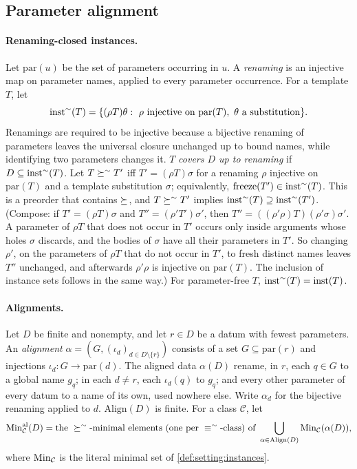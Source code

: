 \subsection{Parameter alignment}\label{app:setting:align}

\paragraph{Renaming-closed instances.}
Let $\mathrm{par}(u)$ be the set of parameters occurring in $u$. A \emph{renaming} is an injective map on parameter names, applied to every parameter occurrence. For a template $T$, let
\[\inst^{\sim}(T)=\{(\rho T)\theta:\ \rho\text{ injective on }\mathrm{par}(T),\ \theta\text{ a substitution}\}.\]
Renamings are required to be injective because a bijective renaming of parameters leaves the universal closure unchanged up to bound names, while identifying two parameters changes it. $T$ \emph{covers $D$ up to renaming} if $D\subseteq\mathrm{inst}^{\sim}(T)$. Let $T\succeq^{\sim}T'$ iff $T'=(\rho T)\sigma$ for a renaming $\rho$ injective on $\mathrm{par}(T)$ and a template substitution $\sigma$; equivalently, $\mathrm{freeze}(T')\in\mathrm{inst}^{\sim}(T)$. This is a preorder that contains $\succeq$, and $T\succeq^{\sim}T'$ implies $\mathrm{inst}^{\sim}(T)\supseteq\mathrm{inst}^{\sim}(T')$. (Compose: if $T'=(\rho T)\sigma$ and $T''=(\rho'T')\sigma'$, then $T''=((\rho'\rho)T)(\rho'\sigma)\sigma'$. A parameter of $\rho T$ that does not occur in $T'$ occurs only inside arguments whose holes $\sigma$ discards, and the bodies of $\sigma$ have all their parameters in $T'$. So changing $\rho'$, on the parameters of $\rho T$ that do not occur in $T'$, to fresh distinct names leaves $T''$ unchanged, and afterwards $\rho'\rho$ is injective on $\mathrm{par}(T)$. The inclusion of instance sets follows in the same way.) For parameter-free $T$, $\mathrm{inst}^{\sim}(T)=\mathrm{inst}(T)$.

\paragraph{Alignments.}
Let $D$ be finite and nonempty, and let $r\in D$ be a datum with fewest parameters. An \emph{alignment} $\alpha=(G,(\iota_d)_{d\in D\setminus\{r\}})$ consists of a set $G\subseteq\mathrm{par}(r)$ and injections $\iota_d:G\to\mathrm{par}(d)$. The aligned data $\alpha(D)$ rename, in $r$, each $q\in G$ to a global name $g_q$; in each $d\neq r$, each $\iota_d(q)$ to $g_q$; and every other parameter of every datum to a name of its own, used nowhere else. Write $\alpha_d$ for the bijective renaming applied to $d$. $\mathrm{Align}(D)$ is finite. For a class $\mathcal C$, let
\[\mathrm{Min}^{\mathrm{al}}_{\mathcal C}(D)=\text{the }\succeq^{\sim}\text{-minimal elements (one per }\equiv^{\sim}\text{-class) of }\bigcup_{\alpha\in\mathrm{Align}(D)}\mathrm{Min}_{\mathcal C}(\alpha(D)),\]
where $\mathrm{Min}_{\mathcal C}$ is the literal minimal set of \cref{def:setting:instances}.

